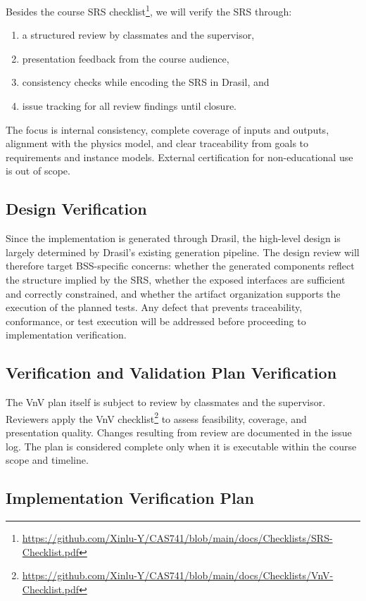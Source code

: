 \documentclass[12pt, titlepage]{article}
\begin{document}
Besides the course SRS
checklist\footnote{\url{https://github.com/Xinlu-Y/CAS741/blob/main/docs/Checklists/SRS-Checklist.pdf}},
we will verify the SRS through:
\begin{enumerate}
  \item a structured review by classmates and the supervisor,
  \item presentation feedback from the course audience,
  \item consistency checks while encoding the SRS in Drasil, and
  \item issue tracking for all review findings until closure.
\end{enumerate}
The focus is internal consistency, complete coverage of inputs and outputs,
alignment with the physics model, and clear traceability from goals to
requirements and instance models. External certification for non-educational
use is out of scope.

\subsection{Design Verification}

Since the implementation is generated through Drasil, the high-level design is
largely determined by Drasil's existing generation pipeline. The design review
will therefore target BSS-specific concerns: whether the generated components
reflect the structure implied by the SRS, whether the exposed interfaces are
sufficient and correctly constrained, and whether the artifact organization
supports the execution of the planned tests. Any defect that prevents
traceability, conformance, or test execution will be addressed before proceeding
to implementation verification.
\subsection{Verification and Validation Plan Verification}

The VnV plan itself is subject to review by classmates and the supervisor.
Reviewers apply the VnV
checklist\footnote{\url{https://github.com/Xinlu-Y/CAS741/blob/main/docs/Checklists/VnV-Checklist.pdf}}
to assess feasibility, coverage, and
presentation quality. Changes resulting from review are documented in the issue
log. The plan is considered complete only when it is executable within the
course scope and timeline.

\subsection{Implementation Verification Plan}
\end{document}
